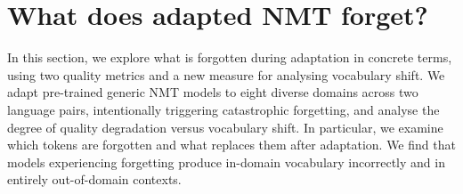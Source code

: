 \documentclass[11pt]{article}
\begin{document}




\section{What does adapted NMT forget?}
\label{sec:what}

In this section, we explore what is forgotten during adaptation in concrete terms, using two quality metrics and a new measure for analysing vocabulary shift. We adapt pre-trained generic NMT models to eight diverse domains across two language pairs, intentionally triggering catastrophic forgetting, and analyse the degree of quality degradation versus vocabulary shift. In particular, we examine which tokens are forgotten and what replaces them after adaptation. We find that models experiencing forgetting produce in-domain vocabulary incorrectly and in entirely out-of-domain contexts.


\end{document}
